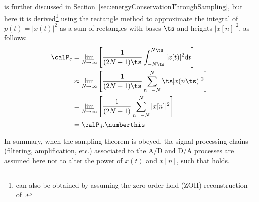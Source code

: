  is further discussed in Section~\ref{sec:energyConservationThroughSampling}, but here it is derived\footnote{ can also be obtained by assuming the zero-order hold (ZOH) reconstruction of .} using the rectangle method to approximate the integral of $p(t)=|x(t)|^2$ as a sum of rectangles with bases $\ts$ and heights $|x[n]|^2$,
 as follows:
\begin{align*}
\calP_c &= \lim_{N \rightarrow \infty} \left[ \frac{1}{(2N+1)\ts} \int_{-N \ts}^{N \ts}{|x(t)|^2}\textrm{d}t \right]  \\
   &\approx \lim_{N \rightarrow \infty} \left[ \frac{1}{(2N+1)\ts} \sum_{n=-N }^{N }{\ts|x(n\ts)|^2} \right] \\
   &= \lim_{N \rightarrow \infty} \left[ \frac{1}{(2N+1)} \sum_{n=-N }^{N }{|x[n]|^2} \right] \\	
	&= \calP_d. \numberthis
\end{align*}



In summary, when the sampling theorem is obeyed, the signal processing chains (filtering, amplification, etc.) associated to the A/D and D/A processes are assumed here not to alter the power of $x(t)$ and $x[n]$, such that  holds.

